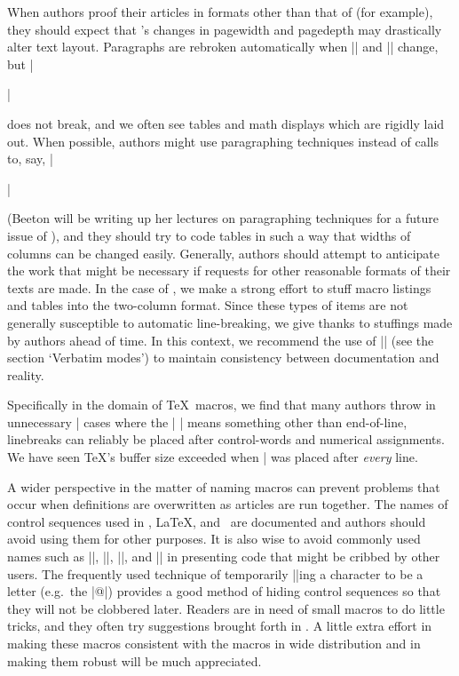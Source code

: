 When authors proof their articles in formats other than that of \TUB\/
(for example), they should expect that \TUB's changes in pagewidth and
pagedepth may drastically alter text layout.  Paragraphs are rebroken
automatically when |\hsize| and |\vsize| change, but |\centerline|
does not break, and we often see tables and math displays which are
rigidly laid out.  When possible, authors might use paragraphing
techniques instead of calls to, say, |\centerline| (Beeton will be
writing up her lectures on paragraphing techniques for a future issue
of \TUB\/), and they should try to code tables in such a way that
widths of columns can be changed easily.  Generally, authors should
attempt to anticipate the work that might be necessary if requests for
other reasonable formats of their texts are made.  In the case of
\TUB, we make a strong effort to stuff macro listings and tables into
the two-column format.  Since these types of items are not generally
susceptible to automatic line-breaking, we give thanks to stuffings
made by authors ahead of time.  In this context, we recommend the use
of || (see the section `{Verbatim modes}') to maintain
consistency between documentation and reality.

Specifically in the domain of \TeX\ macros, we find that many authors
throw in unnecessary |%
cases where the |^^M| means something other than end-of-line,
linebreaks can reliably be placed after control-words and numerical
assignments.  We have seen \TeX's buffer size exceeded when |%
was placed after {\it every\/} line.

A wider perspective in the matter of naming macros can prevent
problems that occur when definitions are overwritten as articles are
run together.  The names of control sequences used in \plain, \LaTeX,
and \AmSTeX\ are documented and authors should avoid using them for
other purposes.  It is also wise to avoid commonly used names such as
|\temp|, |\result|, |\1|, and |\mac| in presenting code that might be
cribbed by other users.  The frequently used technique of temporarily
|\catcode|ing a character to be a letter (e.g.\ the |@|) provides a
good method of hiding control sequences so that they will not be
clobbered later.  Readers are in need of small macros to do little
tricks, and they often try suggestions brought forth in \TUB.  A
little extra effort in making these macros consistent with the macros
in wide distribution and in making them robust will be much
appreciated.



